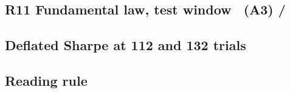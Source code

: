 \subsection*{R11 Fundamental law, test window \hfill \tagc\ (A3) / \tagp}
{\footnotesize\setlength{\tabcolsep}{4pt}}\par\medskip
\subsection*{Deflated Sharpe at 112 and 132 trials \hfill \tagp}
{\footnotesize\setlength{\tabcolsep}{4pt}}\par\medskip
\subsection*{Reading rule \hfill \tagp}
{\footnotesize\setlength{\tabcolsep}{4pt}}\par\medskip
